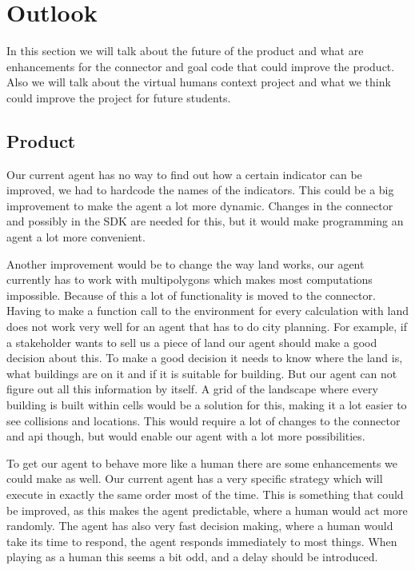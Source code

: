 \chapter{Outlook}
In this section we will talk about the future of the product and what are enhancements for the connector and goal code that could improve the product. Also we will talk about the virtual humans context project and what we think could improve the project for future students.

\section {Product}
Our current agent has no way to find out how a certain indicator can be improved, we had to hardcode the names of the indicators. This could be a big improvement to make the agent a lot more dynamic. Changes in the connector and possibly in the SDK are needed for this, but it would make programming an agent a lot more convenient.

Another improvement would be to change the way land works, our agent currently has to work with multipolygons which makes most computations impossible. Because of this a lot of functionality is moved to the connector. Having to make a function call to the environment for every calculation with land does not work very well for an agent that has to do city planning. For example, if a stakeholder wants to sell us a piece of land our agent should make a good decision about this. To make a good decision it needs to know where the land is, what buildings are on it and if it is suitable for building. But our agent can not figure out all this information by itself. A grid of the landscape where every building is built within cells would be a solution for this, making it a lot easier to see collisions and locations. This would require a lot of changes to the connector and api though, but would enable our agent with a lot more possibilities.

To get our agent to behave more like a human there are some enhancements we could make as well. Our current agent has a very specific strategy which will execute in exactly the same order most of the time. This is something that could be improved, as this makes the agent predictable, where a human would act more randomly. The agent has also very fast decision making, where a human would take its time to respond, the agent responds immediately to most things. When playing as a human this seems a bit odd, and a delay should be introduced.
